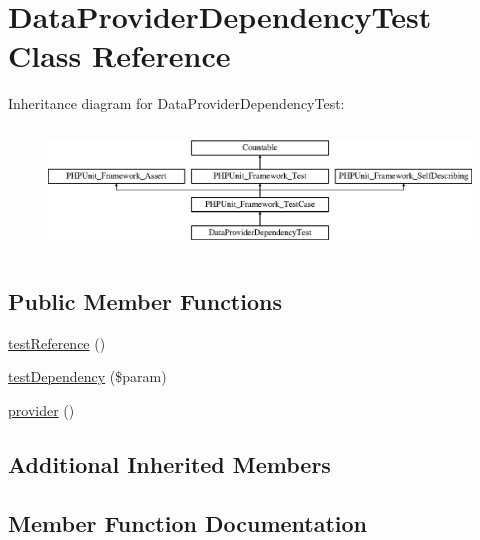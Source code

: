 \hypertarget{class_data_provider_dependency_test}{}\section{Data\+Provider\+Dependency\+Test Class Reference}
\label{class_data_provider_dependency_test}
Inheritance diagram for Data\+Provider\+Dependency\+Test\+:\begin{figure}[H]
\begin{center}
\leavevmode
\includegraphics[height=3.303835cm]{class_data_provider_dependency_test}
\end{center}
\end{figure}
\subsection*{Public Member Functions}
\begin{DoxyCompactItemize}
\item 
\mbox{\hyperlink{class_data_provider_dependency_test_a45b17112a04e0fb2b4522ce8bf221b97}{test\+Reference}} ()
\item 
\mbox{\hyperlink{class_data_provider_dependency_test_ad6e80c77f7710ad021537a504bc76020}{test\+Dependency}} (\$param)
\item 
\mbox{\hyperlink{class_data_provider_dependency_test_a141540808e5970d27589425027e66cc9}{provider}} ()
\end{DoxyCompactItemize}
\subsection*{Additional Inherited Members}


\subsection{Member Function Documentation}
\mbox{\label{class_data_provider_dependency_test_a141540808e5970d27589425027e66cc9}} 
